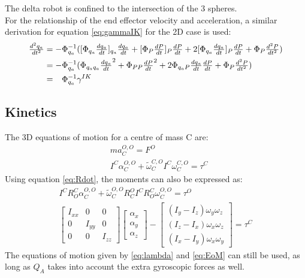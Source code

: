 The delta robot is confined to the intersection of the 3 spheres.\\

For the relationship of the end effector velocity and acceleration, a similar derivation for equation \ref{eq:gammaIK} for the 2D case is used:
\begin{equation}
\begin{aligned}
\tfrac{d^2q_a}{dt^2}&=-\Phi_{q_a}^{-1}([\Phi_{q_a}\tfrac{dq_a}{dt}]_{q_a}\tfrac{dq_a}{dt}+[\Phi_{P}\tfrac{dP}{dt}]_{P}\tfrac{dP}{dt}+2[\Phi_{q_a}\tfrac{dq_a}{dt}]_{P}\tfrac{dP}{dt}+\Phi_P\tfrac{d^2P}{dt^2})\\
&=-\Phi_{q_a}^{-1} (\Phi_{q_aq_a}\tfrac{dq_a}{dt}^2+\Phi_{PP}\tfrac{dP}{dt}^2+2\Phi_{q_aP}\tfrac{dq_a}{dt}\tfrac{dP}{dt}+\Phi_P\tfrac{d^2P}{dt^2}) \\
&=\hphantom{-}\Phi_{q_a}^{-1}\gamma^{IK}
\end{aligned}
\end{equation}

\subsection{Kinetics}

The 3D equations of motion for a centre of mass C are:
\begin{equation}
\begin{aligned}
&m a_C^{O,O}=F^O \\
&I^C \alpha_C^{O,O}+\tilde{\omega}_C^{C,O} I^C \omega_C^{C,O}=\tau^C
\end{aligned}
\end{equation}
Using equation \ref{eq:Rdot}, the moments can also be expressed as:
\begin{align*}
I^C R^C_O\alpha_C^{O,O}+\tilde{\omega}_C^{O,O} R^O_C I^C R^C_O \omega_C^{O,O}=\tau^O \\
\begin{bmatrix}
I_{xx} & 0 & 0 \\
0   & I_{yy} & 0 \\
0 & 0 & I_{zz}
\end{bmatrix}
\begin{bmatrix}
\alpha_x \\
\alpha_y \\
\alpha_z
\end{bmatrix}
-
\begin{bmatrix}
(I_y-I_z)\omega_y \omega_z \\
(I_z-I_x)\omega_x \omega_z \\
(I_x-I_y)\omega_x \omega_y
\end{bmatrix}
=\tau^C
\end{align*}
The equations of motion given by \ref{eq:lambda} and \ref{eq:EoM} can still be used, as long as $Q_A$ takes into account the extra gyroscopic forces as well.\\

